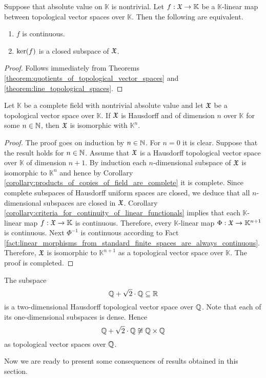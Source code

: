 \documentclass[10pt]{amsart}
\begin{document}
\begin{corollary}\label{corollary:criteria_for_continuity_of_linear_functionals}
	Suppose that absolute value on $\mathbb{K}$ is nontrivial. Let $f:{\mathfrak X} \rightarrow \mathbb{K}$ be a $\mathbb{K}$-linear map between topological vector spaces over $\mathbb{K}$. Then the following are equivalent.
	\begin{enumerate}[label=\emph{\textbf{(\roman*)}}, leftmargin=*]
		\item $f$ is continuous.
		\item $\mathrm{ker}(f)$ is a closed subspace of ${\mathfrak X}$.
	\end{enumerate}
\end{corollary}
\begin{proof}
	Follows immediately from Theorems \ref{theorem:quotients_of_topological_vector_spaces} and \ref{theorem:line_topological_spaces}.
\end{proof}

\begin{theorem}\label{theorem:uniqueness_of_finite_dimensional_Hausdorff_top_vec_spaces}
	Let $\mathbb{K}$ be a complete field with nontrivial absolute value and let ${\mathfrak X}$ be a topological vector space over $\mathbb{K}$. If ${\mathfrak X}$ is Hausdorff and of dimension $n$ over $\mathbb{K}$ for some $n\in {\mathbb N}$, then ${\mathfrak X}$ is isomorphic with $\mathbb{K}^n$.
\end{theorem}
\begin{proof}
	The proof goes on induction by $n\in {\mathbb N}$. For $n = 0$ it is clear. Suppose that the result holds for $n \in {\mathbb N}$. Assume that ${\mathfrak X}$ is a Hausdorff topological vector space over $\mathbb{K}$ of dimension $n + 1$. By induction each $n$-dimensional subspace of ${\mathfrak X}$ is isomorphic to $\mathbb{K}^n$ and hence by Corollary \ref{corollary:products_of_copies_of_field_are_complete} it is complete. Since complete subspaces of Hausdorff uniform spaces are closed, we deduce that all $n$-dimensional subspaces are closed in ${\mathfrak X}$. Corollary \ref{corollary:criteria_for_continuity_of_linear_functionals} implies that each $\mathbb{K}$-linear map $f:{\mathfrak X}\rightarrow \mathbb{K}$ is continuous. Therefore, every $\mathbb{K}$-linear map $\Phi:{\mathfrak X} \rightarrow \mathbb{K}^{n+1}$ is continuous. Next $\Phi^{-1}$ is continuous according to Fact \ref{fact:linear_morphisms_from_standard_finite_spaces_are_always_continuous}. Therefore, ${\mathfrak X}$ is isomorphic to $\mathbb{K}^{n+1}$ as a topological vector space over $\mathbb{K}$. The proof is completed.
\end{proof}

\begin{example}\label{example:two_dimensional_top_vec_space_over_rationals_which_is_not_square_of_rationals}
	The subspace
	$${\mathbb Q} + \sqrt{2}\cdot {\mathbb Q}\subseteq {\mathbb R}$$
	is a two-dimensional Hausdorff topological vector space over ${\mathbb Q}$. Note that each of its one-dimensional subspaces is dense. Hence
	$${\mathbb Q} + \sqrt{2}\cdot {\mathbb Q} \not \cong {\mathbb Q}\times {\mathbb Q}$$
	as topological vector spaces over ${\mathbb Q}$.
\end{example}
\noindent
Now we are ready to present some consequences of results obtained in this section.
\end{document}
